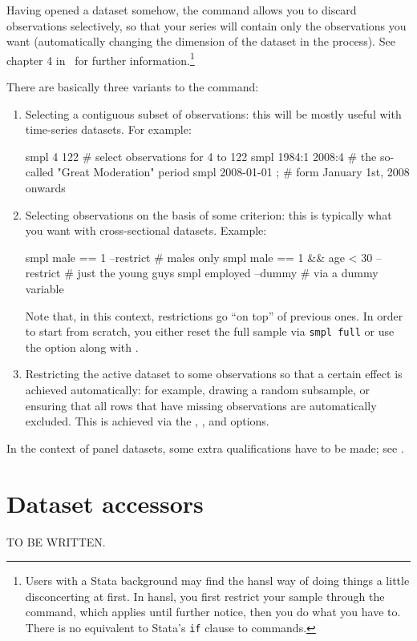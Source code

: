 Having opened a dataset somehow, the  command allows you to
discard observations selectively, so that your series will contain
only the observations you want (automatically changing the dimension
of the dataset in the process). See chapter 4 in \GUG\ for further
information.\footnote{Users with a Stata background may find the hansl
  way of doing things a little disconcerting at first. In hansl, you
  first restrict your sample through the  command, which
  applies until further notice, then you do what you have to. There is
  no equivalent to Stata's \texttt{if} clause to commands.}

There are basically three variants to the  command:
\begin{enumerate}
\item Selecting a contiguous subset of observations: this will be
  mostly useful with time-series datasets. For example:
  \begin{code}
    smpl 4 122            # select observations for 4 to 122
    smpl 1984:1 2008:4    # the so-called "Great Moderation" period
    smpl 2008-01-01 ;     # form January 1st, 2008 onwards
  \end{code}
\item Selecting observations on the basis of some criterion: this is
  typically what you want with cross-sectional datasets. Example:
  \begin{code}
    smpl male == 1 --restrict                # males only
    smpl male == 1 && age < 30 --restrict    # just the young guys
    smpl employed --dummy                    # via a dummy variable
  \end{code}
  Note that, in this context, restrictions go ``on top'' of previous
  ones. In order to start from scratch, you either reset the full
  sample via \texttt{smpl full} or use the  option
  along with .
\item Restricting the active dataset to some observations so that a
  certain effect is achieved automatically: for example, drawing a
  random subsample, or ensuring that all rows that have missing
  observations are automatically excluded. This is achieved via the
  , , and 
  options.
\end{enumerate}

In the context of panel datasets, some extra qualifications have to be
made; see \GUG.

\section{Dataset accessors}
\label{sec:accessors}

TO BE WRITTEN.

